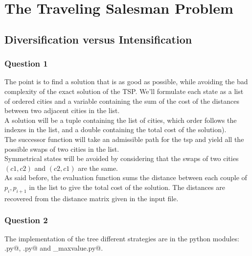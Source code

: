 \documentclass[a4paper,10pt]{article}
\begin{document}
	\newpage
	
\section{The Traveling Salesman Problem}
\subsection{Diversification versus Intensification}
\subsubsection{Question 1}
The point is to find a solution that is as good as possible, while avoiding the bad complexity of the exact solution of the TSP. 
We'll formulate each state as a list of ordered cities and a variable containing the sum of the cost of the distances between two adjacent cities in the list.\\
A solution will be a tuple containing the list of cities, which order follows the indexes in the list, and a double containing the total cost of the solution).\\
The successor function will take an admissible path for the tsp and yield all the possible swaps of two cities in the list.\\
Symmetrical states will be avoided by considering that the swaps of two cities $(c1, c2)$ and $(c2, c1)$ are the same.\\
As said before, the evaluation function sums the distance between each couple of $p_{i}, p_{i+1}$ in the list to give the total cost of the solution.
The distances are recovered from the distance matrix given in the input file.
\subsubsection{Question 2}
The implementation of the tree different strategies are in the python modules: \verb@randomwalk.py@, \verb@maxvalue.py@ and \verb@randomized_maxvalue.py@.
\end{document}
